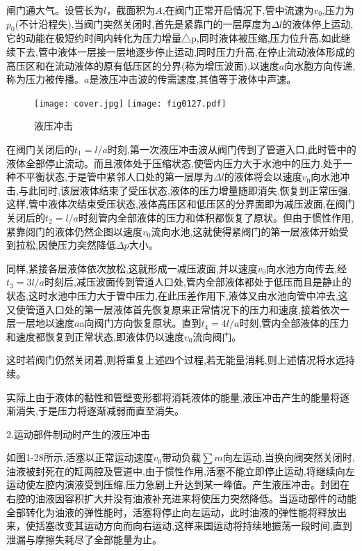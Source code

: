 闸门通大气。设管长为$l$，截面积为$A$,在阀门正常开启情况下,管中流速为$v_0$,压力为$p_0$(不计沿程失),当阀门突然关闭时,首先是紧靠门的一层厚度为$\varDelta l$的液体停上运动,它的动能在极短约时间内转化为压力增量△p,同时液体被压缩,压力位升高,如此继续下去,管中液体一层接一层地逐步停止运动,同时压力升高,在停止流动液体形成的高压区和在流动液体的原有低压区的分界(称为增压波面),以速度$a$向水胞方向传递,称为压力被传播。$a$是液压冲击波的传需速度,其值等于液体中声速。

\begin{figure}
\centering
\ifOpenSource
\texttt{[image: cover.jpg]}   %
\else 
\texttt{[image: fig0127.pdf]}  %
\fi
\caption{液压冲击}
\label{fig:fig0127}
\end{figure}

在阀门关闭后的$t_1=l/a$时刻,第一次液压冲击波从阀门传到了管道入口,此时管中的液体全部停止流动。而且液体处于压缩状态,使管内压力大于水池中的压力,处于一种不平衡状态,于是管中紧邻人口处的第一层厚为$\varDelta l$的液体将会以速度$v_0$向水池冲击,与此同时,该层液体结束了受压状态,液体的压力增量随即消失,恢复到正常压强,这样,管中液体次结束受压状态,液体高压区和低压区的分界面即为减压波面,在阀门关闭后的$t_2=l/a$时刻管内全部液体的压力和体积都恢复了原状。但由于惯性作用,紧靠阅门的液体仍然企图以速度$v_0$流向水池,这就使得紧阀门的第一层液体开始受到拉松,因使压力突然降低$\varDelta p$大小。

同样,紧接各层液体依次放松,这就形成一减压波面,并以速度$v_0$向水池方向传去,经$t_3=3l/a$时刻后,减压波面传到管道人口处,管内全部液体都处于低压而且是静止的状态,这时水池中压力大于管中压力,在此压差作用下,液体又由水池向管中冲去,这又使管道入口处的第一层液体首先恢复原来正常情况下的压力和速度,接着依次一层一层地以速度$a$a向阀门方向恢复原状。直到$t_4=4l/a$时刻,管内全部液体的压力和速度都恢复到正常状态,即液体仍以速度$v_0$流向阀门。

这时若阀门仍然关闭着,则将重复上述四个过程,若无能量消耗,则上述情况将水远持续。

实际上由于液体的黏性和管壁变形都将消耗液体的能量,液压冲击产生的能量将逐渐消失,于是压力将逐渐减弱而直至消失。

2.运动部件制动时产生的液压冲击

如图1-28所示,活塞以正常运动速度$v_0$带动负载$\sum{m}$向左运动,当换向阀突然关闭时,油液被封死在的缸两腔及管道中,由于惯性作用,活塞不能立即停止运动,将继续向左运动使左腔内演液受到压缩,压力急剧上升达到某一峰值。产生液压冲击。封团在右腔的油液因容积扩大并没有油液补充进来将使压力突然降低。当运动部件的动能全部转化为油液的弹性能时，活塞将停止向左运动，此时油液的弹性能将释放出来，使括塞改变其运动方向而向右运动,这样来国运动将持续地振荡一段时间,直到泄漏与摩擦失耗尽了全部能量为止。

